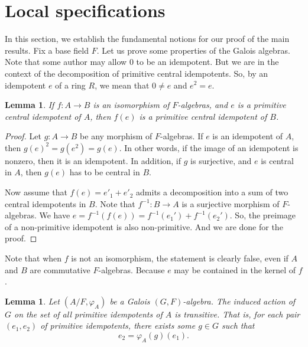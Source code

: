 \documentclass[12pt,a4paper]{amsart}
\numberwithin{equation}{section}%
\theoremstyle{plain}%
\newtheorem{lemma}[theorem]{Lemma}%
\theoremstyle{definition}%
\theoremstyle{remark}%
\begin{document}
	\section{Local specifications}\label{sec: specifications}
	In this section, we establish the fundamental notions for our proof of the main results.
	Fix a base field $F$.
	Let us prove some properties of the Galois algebras.
	Note that some author may allow $0$ to be an idempotent.
	But we are in the context of the decomposition of primitive central idempotents.
	So, by an idempotent $e$ of a ring $R$, we mean that $0\neq e$ and $e^2=e$.
	\begin{lemma}\label{lemma: central idempotents}
		If $f:A\to B$ is an isomorphism of $F$-algebras, and $e$ is a primitive central idempotent of $A$, then $f(e)$ is a primitive central idempotent of $B$.
	\end{lemma}
	\begin{proof}
		Let $g:A\to B$ be any morphism of $F$-algebras.
		If $e$ is an idempotent of $A$, then $g(e)^2=g(e^2)=g(e)$.
		In other words, if the image of an idempotent is nonzero, then it is an idempotent.
		In addition, if $g$ is surjective, and $e$ is central in $A$, then $g(e)$ has to be central in $B$.
		
		Now assume that $f(e)=e'_1+e'_2$ admits a decomposition into a sum of two central idempotents in $B$.
		Note that $f^{-1}:B\to A$ is a surjective morphism of $F$-algebras.
		We have $e=f^{-1}(f(e))=f^{-1}(e_1')+f^{-1}(e_2')$.
		So, the preimage of a non-primitive idempotent is also non-primitive.
		And we are done for the proof.
	\end{proof}
	Note that when $f$ is not an isomorphism, the statement is clearly false, even if $A$ and $B$ are commutative $F$-algebras.
	Because $e$ may be contained in the kernel of $f$.
	\begin{lemma}\label{lemma: transitivity on idempotents}
		Let $(A/F,\varphi_A)$ be a Galois $(G,F)$-algebra.
		The induced action of $G$ on the set of all primitive idempotents of $A$ is transitive.
		That is, for each pair $(e_1,e_2)$ of primitive idempotents, there exists some $g\in G$ such that
		\begin{equation*}
			e_2=\varphi_A(g)(e_1).
		\end{equation*}
	\end{lemma}
\end{document}
